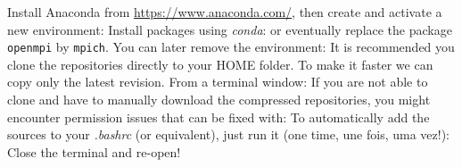 {}
\markdownRendererSectionEnd \markdownRendererSectionBegin
{}\markdownRendererInterblockSeparator
{}Install Anaconda from \url{https://www.anaconda.com/}, then create and activate a new environment:\markdownRendererInterblockSeparator
{}\markdownRendererInterblockSeparator
{}Install packages using \textit{conda}:\markdownRendererInterblockSeparator
{}\markdownRendererInterblockSeparator
{}or eventually replace the package \texttt{openmpi} by \texttt{mpich}.\markdownRendererInterblockSeparator
{}\markdownRendererInterblockSeparator
{}You can later remove the environment:\markdownRendererInterblockSeparator
{}\markdownRendererInterblockSeparator
{}\newpage\markdownRendererInterblockSeparator
{}
\markdownRendererSectionEnd 
\markdownRendererSectionEnd \markdownRendererSectionBegin
{}\markdownRendererInterblockSeparator
{}It is recommended you clone the repositories directly to your HOME folder. To make it faster we can copy only the latest revision. From a terminal window:\markdownRendererInterblockSeparator
{}\markdownRendererInterblockSeparator
{}\markdownRendererInterblockSeparator
{}If you are not able to clone and have to manually download the compressed repositories, you might encounter permission issues that can be fixed with:\markdownRendererInterblockSeparator
{}\markdownRendererInterblockSeparator
{}\markdownRendererSectionBegin
{}\markdownRendererInterblockSeparator
{}To automatically add the sources to your \textit{.bashrc} (or equivalent), just run it (one time, une fois, uma vez!):\markdownRendererInterblockSeparator
{}\markdownRendererInterblockSeparator
{}Close the terminal and re-open! \newpage\markdownRendererInterblockSeparator
